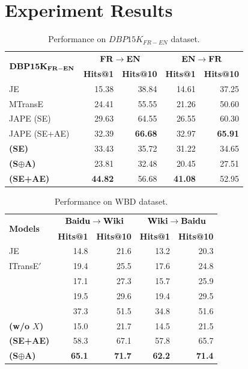 \section{Experiment Results\label{sec:results}}


\begin{table}
	\centering
	\scriptsize
	\begin{tabular}{lrrrr}
		\toprule
		\multirow{2}{*}{$\bf DBP15K_{FR-EN}$} & \multicolumn{2}{c|}{$\bf FR \rightarrow EN$} & \multicolumn{2}{c}{$\bf EN \rightarrow FR$} \\
		& \bf Hits@1 & \bf Hits@10 & \bf Hits@1 & \bf Hits@10 \\
		\midrule
		\rowcolor{Gray}JE & 15.38 & 38.84 & 14.61 & 37.25 \\
		MTransE & 24.41 & 55.55 & 21.26 & 50.60 \\
		\rowcolor{Gray}JAPE (SE) & 29.63 & 64.55 & 26.55 & 60.30 \\
		JAPE (SE+AE) & 32.39 & \bf 66.68 & 32.97 & \bf 65.91 \\
		\rowcolor{Gray} \bf \HRGCN (SE) & 33.43& 35.72& 31.22& 34.65 \\
		\bf \HRGCN (S$\oplus$A) & 23.81 & 32.48 & 20.45 & 27.51 \\
        \rowcolor{Gray} 	\bf \HRGCN (SE+AE) & \bf 44.82 & 56.68 &\bf 41.08 & 52.95 \\
		\bottomrule
	\end{tabular}
	\caption{Performance on $DBP15K_{FR-EN}$ dataset.}
	\label{cross}
\end{table}

\begin{table}
	\centering
	\scriptsize
	\begin{tabular}{lrrrr}
		\toprule
		\multirow{2}{*}{\bf Models} &  \multicolumn{2}{c|}{$\bf Baidu \rightarrow Wiki$} & \multicolumn{2}{c}{$\bf Wiki \rightarrow Baidu$} \\
		& \bf Hits@1 & \bf Hits@10 & \bf Hits@1 & \bf Hits@10 \\
		\midrule
		\rowcolor{Gray} JE & 14.8 & 21.6 & 13.2 & 20.3 \\
		ITransE$'$ & 19.4 & 25.5 & 17.6 & 24.8 \\
		\rowcolor{Gray} \GCN & 17.1 & 27.3 & 15.7 & 25.9 \\
		\HGCN & 19.5 & 29.6 & 19.4 & 29.5  \\
		\rowcolor{Gray} \RGCN & 37.3 & 51.5 & 34.8 & 51.6 \\
		\bf \HRGCN (w/o $X$) & 15.0 & 21.7 & 14.5 & 21.5 \\
		\rowcolor{Gray} \bf \HRGCN (SE+AE) & 58.3 & 67.1 & 57.8{\tiny } & 65.7 \\
		\bf \HRGCN (S$\oplus$A) & \bf 65.1 & \bf 71.7 & \bf 62.2 & \bf 71.4\\
		\bottomrule
	\end{tabular}
	\caption{Performance on WBD dataset.}
	\label{f1}
\end{table}
